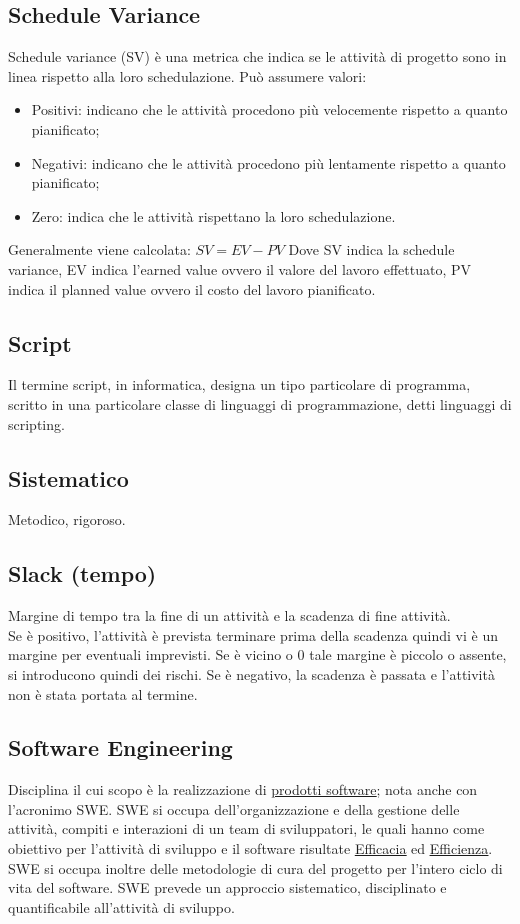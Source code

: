 	
	\subsection{Schedule Variance}
	\label{sec:schedulevariance}
	Schedule variance (SV) è una metrica che indica se le attività di progetto sono in linea rispetto alla loro schedulazione.
	Può assumere valori:
	\begin{itemize}
	\item Positivi: indicano che le attività procedono più velocemente rispetto a quanto pianificato;
	\item Negativi: indicano che le attività procedono più lentamente rispetto a quanto pianificato;
	\item Zero: indica che le attività rispettano la loro schedulazione.
	\end{itemize}
	Generalmente viene calcolata: $SV = EV - PV$
	Dove SV indica la schedule variance, EV indica l'earned value ovvero il valore del lavoro effettuato, PV indica il planned value ovvero il costo del lavoro pianificato.


	\subsection{Script}
	\label{sec:script}
	Il termine script, in informatica, designa un tipo particolare di programma, scritto in una particolare classe di linguaggi di programmazione, detti linguaggi di scripting.


	\subsection{Sistematico}
	\label{sec:sistematico}
	Metodico, rigoroso.


	\subsection{Slack (tempo)}
	\label{sec:slackt}
	Margine di tempo tra la fine di un attività e la scadenza di fine attività. \\
	Se è positivo, l'attività è prevista terminare prima della scadenza quindi vi è un margine per eventuali imprevisti. Se è vicino o 0 tale margine è piccolo o assente, si introducono quindi dei rischi. Se è negativo, la scadenza è passata e l'attività non è stata portata al termine.


	\subsection{Software Engineering}
	\label{sec:swe}
	Disciplina il cui scopo è la realizzazione di  \underline{\hyperref[sec:prodottosoftware]{prodotti software}}; nota anche con l'acronimo SWE.
	SWE si occupa dell'organizzazione e della gestione delle attività, compiti e interazioni di un team di sviluppatori,
	le quali hanno come obiettivo per l'attività di sviluppo e il software risultate \underline{\hyperref[sec:efficacia]{Efficacia}} ed \underline{\hyperref[sec:efficienza]{Efficienza}}.
	SWE si occupa inoltre delle metodologie di cura del progetto per l'intero ciclo di vita del software.
	SWE prevede un approccio sistematico, disciplinato e quantificabile all'attività di sviluppo.


